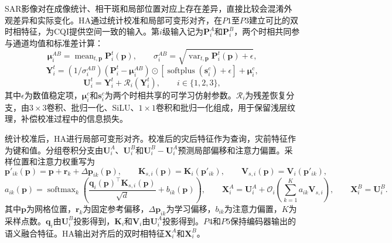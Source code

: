 \documentclass[authoryear,preprint,12pt]{elsarticle}
\begin{document}
SAR影像对在成像统计、相干斑和局部位置对应上存在差异，直接比较会混淆外观差异和实际变化。HA通过统计校准和局部可变形对齐，在\(P1\)至\(P3\)建立可比的双时相特征，为CQI提供空间一致的输入。第\(i\)级输入记为\(\mathbf P_i^A\)和\(\mathbf P_i^B\)，两个时相共同参与通道均值和标准差计算：
\begin{equation}\label{eq:ha_calibration}
 \boldsymbol\mu_i^{AB}=\operatorname{mean}_{t,\mathbf p}\mathbf P_i^t(\mathbf p),\qquad
 \sigma_i^{AB}=\sqrt{\operatorname{var}_{t,\mathbf p}\mathbf P_i^t(\mathbf p)+\epsilon},
\end{equation}
\begin{equation}\label{eq:ha_affine}
 \mathbf Y_i^t=(1/\sigma_i^{AB})(\mathbf P_i^t-\boldsymbol\mu_i^{AB})\odot
 [\operatorname{softplus}(\mathbf s_i^c)+\epsilon]+\boldsymbol\mu_i^c,
\end{equation}
\begin{equation}\label{eq:ha_recovery}
 \mathbf U_i^t=\mathbf Y_i^t+\mathcal{R}_i(\mathbf Y_i^t),
 \qquad i\in\{1,2,3\},
\end{equation}
其中\(\epsilon\)为数值稳定项，\(\boldsymbol\mu_i^c\)和\(\mathbf s_i^c\)为两个时相共享的可学习仿射参数。\(\mathcal R_i\)为残差恢复分支，由\(3\times3\)卷积、批归一化、SiLU、\(1\times1\)卷积和批归一化组成，用于保留浅层纹理，补偿校准过程中的信息损失。

统计校准后，HA进行局部可变形对齐\citep{zhu2021deformable}。校准后的灾后特征作为查询，灾前特征作为键和值。分组卷积分支由\(\mathbf U_i^A\)、\(\mathbf U_i^B\)和\(\mathbf U_i^B-\mathbf U_i^A\)预测局部偏移和注意力偏置。采样位置和注意力权重写为
\begin{equation}\label{eq:ha_alignment}
 \mathbf p'_{ik}(\mathbf p)=\mathbf p+\mathbf r_k+\Delta\mathbf p_{ik}(\mathbf p),
 \qquad
 \mathbf K_{s,i}(\mathbf p)=\mathbf K_i(\mathbf p'_{ik}),
 \qquad
 \mathbf V_{s,i}(\mathbf p)=\mathbf V_i(\mathbf p'_{ik}),
\end{equation}
\begin{equation}\label{eq:ha_output}
 a_{ik}(\mathbf p)=\operatorname{softmax}_k\!\left(
 \frac{\mathbf q_i(\mathbf p)^{\top}\mathbf K_{s,i}(\mathbf p)}{\sqrt d}
 +b_{ik}(\mathbf p)\right),\qquad
 \mathbf X_i^A=\mathbf U_i^A+\mathcal O_i\!\left(
 \sum_{k=1}^{K}a_{ik}\mathbf V_{s,i}\right),\qquad
 \mathbf X_i^B=\mathbf U_i^B.
\end{equation}
其中\(\mathbf p\)为网格位置，\(\mathbf r_k\)为固定参考偏移，\(\Delta\mathbf p_{ik}\)为学习偏移，\(b_{ik}\)为注意力偏置，\(K\)为采样点数。\(\mathbf q_i\)由\(\mathbf U_i^B\)投影得到，\(\mathbf K_i\)和\(\mathbf V_i\)由\(\mathbf U_i^A\)投影得到。\(P4\)和\(P5\)保持编码器输出的语义融合特征。HA输出对齐后的双时相特征\(\mathbf X_i^A\)和\(\mathbf X_i^B\)。
\end{document}

